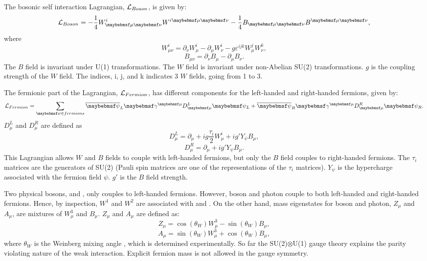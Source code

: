 The bosonic self interaction Lagrangian, $\operatorname{\mathcal{L}}_{Boson}$, is given by:
\begin{equation}
\Lagr_{Boson} = - \frac{1}{4} W^i_{\mu\nu} W^{i\mu\nu} - \frac{1}{4}B_{\mu\nu} B^{\mu\nu},
\end{equation}
where
\begin{equation}
W^i_{\mu\nu} = \partial_{\nu}W^i_{\mu} - \partial_{\mu}W^i_{\nu} - g\varepsilon^{ijk}W^j_{\mu}W^k_\nu ,
\end{equation}
\begin{equation}
B_{\mu\nu} = \partial_{\nu}B_{\mu} - \partial_{\mu}B_{\nu} .
\end{equation}
The $B$ field  is invariant under U(1) transformations. The $W$ field is invariant under non-Abelian SU(2) transformations. $g$ is the coupling strength of the $W$ field. The indices, i, j, and k indicates 3 $W$ fields, going from 1 to 3.

The fermionic part of the Lagrangian,   $\operatorname{\mathcal{L}}_{Fermion}$, has different components for the left-handed and right-handed fermions, given by:
\begin{equation}
\Lagr_{Fermion} = \sum_{\psi\in{fermions}} {\overline{\psi}}_L \gamma^{\mu}D^L_{\mu} \psi_L +  \overline{\psi}_R \gamma^{\mu}D^R_{\mu} \psi_R .
\end{equation}
$D^L_{\mu}$ and $D^R_{\mu}$ are defined as
\begin{equation}
D^L_{\mu} = \partial_{\mu} + ig\frac{\tau_i}{2}W^i_{\mu} + ig'Y_{\psi}B_{\mu} ,
\end{equation}
\begin{equation}
D^R_{\mu} = \partial_{\mu}  + ig'Y_{\psi}B_{\mu} .
\end{equation}
This Lagrangian allows $W$ and $B$ fields to couple with left-handed fermions, but only the $B$ field couples to right-handed fermions. The $\tau_i$ matrices are the generators of SU(2) (Pauli spin matrices are one of the representations of the $\tau_i$ matrices). $Y_{\psi}$ is the hypercharge associated with the fermion field $\psi$. $g'$ is the $B$ field strength.

Two physical bosons, \PWp and \PWm,  only couples to left-handed fermions. However, \PZ boson and photon couple to both left-handed and right-handed fermions. Hence, by inspection, $W^1$ and $W^2$ are associated with \PWp and \PWm. On the other hand, mass eigenstates for \PZ boson and photon, $Z_{\mu}$ and $A_{\mu}$, are mixtures of $W^3_{\mu}$ and $B_{\mu}$. $Z_{\mu}$ and $A_{\mu}$ are defined as:
\begin{equation}
Z_{\mu} = \cos\left(\theta_W\right)W^3_{\mu} - \sin\left(\theta_W\right)B_{\mu},
\end{equation}
\begin{equation}
A_{\mu} = \sin\left(\theta_W\right)W^3_{\mu} + \cos\left(\theta_W\right)B_{\mu},
\end{equation}
where $\theta_W$ is the Weinberg mixing angle \cite{Weinberg:1967tq}, which is determined experimentally. So far the SU(2)$\otimes$U(1) gauge theory explains the parity violating nature of the weak interaction. Explicit fermion mass is not allowed in the gauge symmetry.

